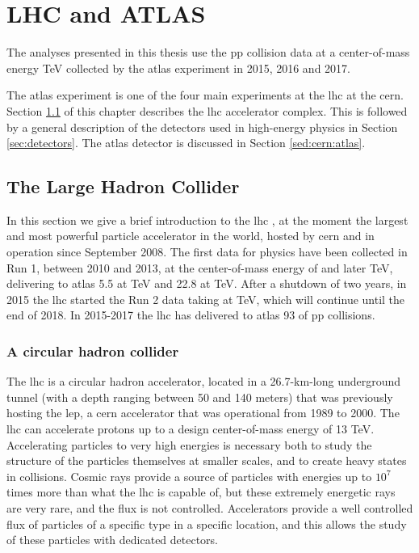 \chapter{LHC and ATLAS}
\label{chap:cern}

The analyses presented in this thesis use the \gls{pp} collision data at a center-of-mass energy \cmtre TeV 
collected by the \gls{atlas} experiment in 2015, 2016 and 2017. 

The \gls{atlas} experiment is one of the four main experiments at the \gls{lhc} at the \gls{cern}. Section \ref{sed:cern:lhc} of this chapter describes the \gls{lhc} accelerator complex. This is followed by a general description of the detectors used in high-energy physics in Section \ref{sec:detectors}. The \gls{atlas} detector is discussed in Section \ref{sed:cern:atlas}.


\section{The Large Hadron Collider}
\label{sed:cern:lhc}

In this section we give a brief introduction to the \gls{lhc} \cite{1748-0221-3-08-S08001}, at the moment the largest and most powerful particle accelerator in the world, hosted by \gls{cern} and in operation since September 2008.
The first data for physics have been collected in Run 1, between 2010 and 2013, at the center-of-mass energy of \cmsette and later 
\cmotto TeV, delivering to \gls{atlas} 5.5 \ifb at \cmsette TeV and 22.8 \ifb at \cmotto TeV.
After a shutdown of two years, in 2015 the \gls{lhc} started the Run 2 data taking at \cmtre TeV, which will continue until the end of 2018. 
In 2015-2017 the \gls{lhc} has delivered to \gls{atlas} 93 \ifb of \gls{pp} collisions. 

\subsection{A circular hadron collider}

The \gls{lhc} is a circular hadron accelerator, located in a 26.7-km-long underground tunnel (with a depth ranging between 50 and 140 meters) that was previously hosting the \gls{lep}, a \gls{cern} accelerator that was operational from 1989 to 2000. The \gls{lhc} can accelerate protons up to a design center-of-mass energy of 13 TeV. Accelerating particles to very high energies is necessary both to study the structure of the particles themselves at smaller scales, and to create heavy states in collisions. Cosmic rays provide a source of particles with energies up to $10^7$ times more than what the \gls{lhc} is capable of, but these extremely energetic rays are very rare, and the flux is not controlled. Accelerators provide a well controlled flux of particles of a specific type in a specific location, and this allows the study of these particles with dedicated detectors.

